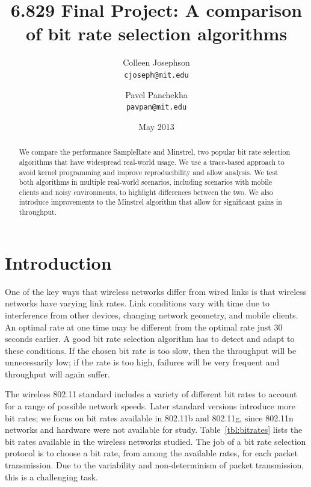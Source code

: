 \documentclass[twocolumn,10pt]{article}
\title{6.829 Final Project: A comparison of bit rate selection algorithms}
\author{Colleen Josephson \\ \texttt{cjoseph@mit.edu}
  \and Pavel Panchekha \\ \texttt{pavpan@mit.edu}}
\date{May 2013}
\begin{document}
\maketitle

\begin{abstract}
We compare the performance SampleRate and Minstrel, two popular bit
rate selection algorithms that have widespread real-world usage.  We
use a trace-based approach to avoid kernel programming and improve
reproducibility and allow analysis.  We test both algorithms in
multiple real-world scenarios, including scenarios with mobile clients
and noisy environments, to highlight differences between the two.  We
also introduce improvements to the Minstrel algorithm that allow for
significant gains in throughput.
\end{abstract}

\section{Introduction}

One of the key ways that wireless networks differ from wired links is
that wireless networks have varying link rates.  Link conditions vary
with time due to interference from other devices, changing network
geometry, and mobile clients.  An optimal rate at one time may be
different from the optimal rate just 30 seconds earlier.  A good
bit rate selection algorithm has to detect and adapt to these
conditions.  If the chosen bit rate is too slow, then the throughput
will be unnecessarily low; if the rate is too high, failures will be
very frequent and throughput will again suffer.

The wireless 802.11 standard includes a variety of different bit rates
to account for a range of possible network speeds.  Later standard
versions introduce more bit rates; we focus on bit rates available in
802.11b and 802.11g, since 802.11n networks and hardware were not
available for study.  Table~\ref{tbl:bitrates} lists the bit rates
available in the wireless networks studied.  The job of a bit rate
selection protocol is to choose a bit rate, from among the available
rates, for each packet transmission.  Due to the variability and
non-determinism of packet transmission, this is a challenging task.
\end{document}
